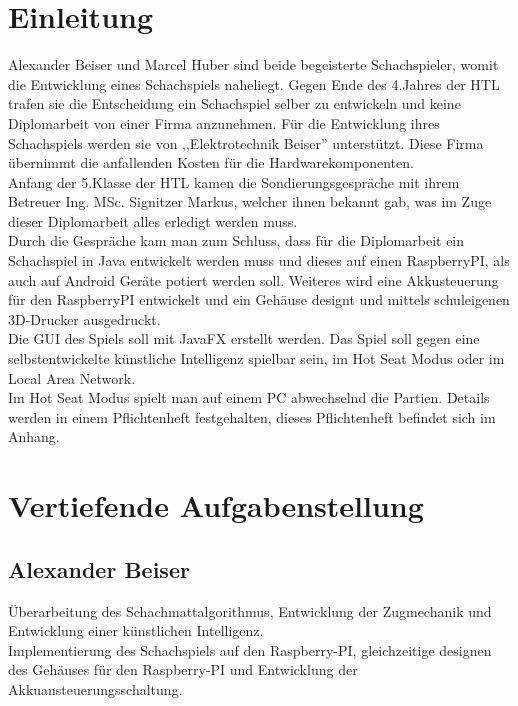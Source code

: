 \documentclass[12pt,a4paper]{article}
\newcommand{\cmnt}[1]{}			%
\newcommand{\yhbu}[0]{\color{ydkbu}}	%
\begin{document}
{\tableofcontents


\clearpage\vfill\newpage{}
\renewcommand{\thepage}{\arabic{page}}%
\setcounter{page}{1}
\setcounter{section}{0}
\section{\sc Einleitung}
\label{SEC:INTRODUCTION}

	Alexander Beiser und Marcel Huber sind beide begeisterte Schachspieler, womit die Entwicklung eines Schachspiels naheliegt. Gegen Ende des 4.Jahres der HTL trafen sie die Entscheidung ein Schachspiel selber zu entwickeln und keine Diplomarbeit von einer Firma anzunehmen. Für die Entwicklung ihres Schachspiels werden sie von ,,Elektrotechnik Beiser'' unterstützt. Diese Firma übernimmt die anfallenden Kosten für die Hardwarekomponenten.\\
	Anfang der 5.Klasse der HTL kamen die Sondierungsgespräche mit ihrem Betreuer Ing. MSc. Signitzer Markus, 
welcher ihnen bekannt gab, was im Zuge dieser Diplomarbeit alles erledigt werden muss. \\
Durch die Gespräche kam man zum Schluss, dass für die Diplomarbeit ein Schachspiel in Java entwickelt werden muss und dieses auf einen RaspberryPI, als auch auf Android Geräte potiert werden soll. Weiteres wird eine Akkusteuerung für den RaspberryPI entwickelt und ein Gehäuse designt und mittels schuleigenen 3D-Drucker ausgedruckt. \\
	Die GUI des Spiels soll mit JavaFX erstellt werden. Das Spiel soll gegen eine selbstentwickelte künstliche Intelligenz spielbar sein, im Hot Seat Modus oder im Local Area Network. \\
	Im Hot Seat Modus spielt man auf einem PC abwechselnd die Partien.
	Details werden in einem Pflichtenheft festgehalten, dieses Pflichtenheft befindet sich im Anhang.
	
\cmnt{
	{\yhbu
	In der Einleitung wird erklärt,
	wieso man sich für dieses Thema entschieden hat.
	(Zielsetzung und Aufgabenstellung des Gesamtprojekts,
	fachliches und wirtschaftliches Umfeld)
	}
	}
\section{\sc Vertiefende Aufgabenstellung}
 \subsection{Alexander Beiser}
 	Überarbeitung des Schachmattalgorithmus, Entwicklung der Zugmechanik und Entwicklung einer künstlichen Intelligenz. \\
Implementierung des Schachspiels auf den Raspberry-PI, gleichzeitige designen des Gehäuses für den Raspberry-PI und Entwicklung der Akkuansteuerungsschaltung. 
	
}
\end{document}
